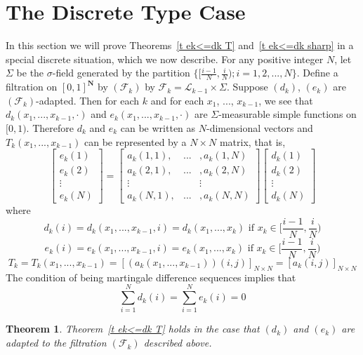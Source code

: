 \documentclass[12pt]{amsart}
\newtheorem{thm}{Theorem}
\begin{document}
\section{The Discrete Type Case}

In this section we will prove Theorems~\ref{t ek<=dk T}
and~\ref{t ek<=dk sharp} in a special discrete situation, which we now describe.
For any positive integer $N$, let $\Sigma $ be the $\sigma
$-field generated by the partition $\{[\frac{i-1}{N},\frac{i}{N});
i=1,2,...,N\}$. Define a filtration on $[0,1]^{\mathbf N}$
by $(\mathcal{F}_k)$ by
$\mathcal{F}_k=\mathcal{L}_{k-1}\times \Sigma $. Suppose $(d_k)$,
$(e_k)$ are $(\mathcal{F}_k)$-adapted.  Then for each $k$ and for
each $x_1$, ..., $x_{k-1}$, we see that $d_k(x_1,...,x_{k-1},\cdot)$ and
$e_k(x_1, ...,x_{k-1},\cdot)$ are $\Sigma$-measurable simple
functions on $[0,1)$. Therefore $d_k$ and $e_k$ can be written as
$N$-dimensional vectors and $T_k(x_1, ...,x_{k-1})$ can be
represented by a $N\times N$ matrix, that is,
\[
\left[ \begin{array}{c} e_k(1) \\ e_k(2) \\ \vdots \\ e_k(N)
\end{array} \right ]
= \left[\begin{array}{ccc} a_k(1,1), & ... & ,a_k(1,N) \\
a_k(2,1), & ... & ,a_k(2,N) \\ \vdots & & \vdots \\ a_k(N,1), &
... & ,a_k(N,N)\end{array}\right] \left[ \begin{array}{c} d_k(1)
\\ d_k(2) \\ \vdots \\ d_k(N) \end{array} \right]
\] 
where
\[d_k(i)=d_k(x_1,...,x_{k-1},i)=d_k(x_1,...,x_{k})
\mbox{ if $x_k \in [\frac{i-1}{N},\frac{i}{N})$}\]
\[e_k(i)=e_k(x_1,...,x_{k-1},i)=e_k(x_1,...,x_{k})
\mbox{ if $x_k \in [\frac{i-1}{N},\frac{i}{N})$}\]
\[T_k=T_k(x_1, ...,x_{k-1})=\left[(a_k(x_1, ...,x_{k-1}))(i,j)\right]_{N\times N}=\left[a_k(i,j)\right]_{N\times N}\]
The condition of being martingale difference sequences implies that
\[ \sum_{i=1}^N d_k(i)= \sum_{i=1}^N e_k(i)=0\]

\begin{thm}
\label{t ek<=dk T disc}
Theorem~\ref{t ek<=dk T} holds in the case that
$(d_k)$ and $(e_k)$ are
adapted to the filtration $(\mathcal F_k)$ described above.
\end{thm}
\end{document}
